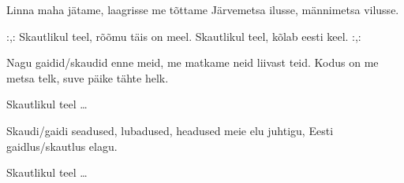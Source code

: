 Linna maha j\"atame, 
laagrisse me t\~ottame
J\"arvemetsa ilusse, 
m\"annimetsa vilusse.

:,: Skautlikul teel, r\~o\~omu t\"ais on meel.
Skautlikul teel, k\~olab eesti keel. :,:

Nagu gaidid/skaudid enne meid,
me matkame neid liivast teid.
Kodus on me metsa telk,
suve p\"aike t\"ahte helk.

Skautlikul teel \ldots

\clearpage Skaudi/gaidi seadused, lubadused, headused
meie elu juhtigu, Eesti gaidlus/skautlus elagu.

Skautlikul teel \ldots